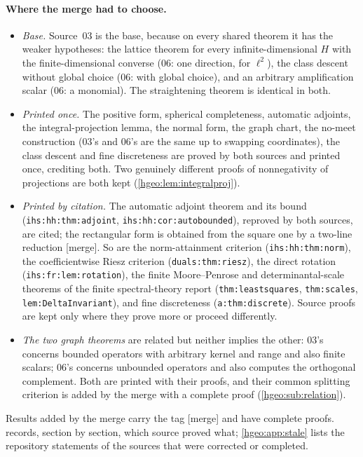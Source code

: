 \documentclass[11pt,letterpaper]{article}
\numberwithin{equation}{section}
\theoremstyle{definition}
\theoremstyle{remark}
\newcommand{\mergetag}{\textup{\textsf{\small[merge]}}}
\newcommand{\replabel}[1]{\nolinkurl{#1}}
\begin{document}
\paragraph{Where the merge had to choose.}
\begin{itemize}[leftmargin=*]
\item \emph{Base.} Source~03 is the base, because on every shared theorem
it has the weaker hypotheses: the lattice theorem for every
infinite-dimensional $H$ with the finite-dimensional converse (06:
one direction, for $\ell^2$), the class descent without global choice (06:
with global choice), and an arbitrary amplification scalar (06: a
monomial). The straightening theorem is identical in both.
\item \emph{Printed once.} The positive form, spherical completeness,
automatic adjoints, the integral-projection lemma, the normal form, the graph
chart, the no-meet construction (03's and 06's are the same up to swapping
coordinates), the class descent and fine discreteness are proved by both
sources and printed once, crediting both. Two genuinely different proofs of
nonnegativity of projections are both kept (\cref{hgeo:lem:integralproj}).
\item \emph{Printed by citation.} The automatic adjoint theorem and its
bound (\replabel{ihs:hh:thm:adjoint}, \replabel{ihs:hh:cor:autobounded}),
reproved by both sources, are cited; the rectangular form is obtained from
the square one by a two-line reduction \mergetag. So are the norm-attainment
criterion (\replabel{ihs:hh:thm:norm}), the coefficientwise Riesz criterion
(\replabel{duals:thm:riesz}), the direct rotation
(\replabel{ihs:fr:lem:rotation}), the finite Moore--Penrose and
determinantal-scale theorems of the finite spectral-theory report
(\replabel{thm:leastsquares}, \replabel{thm:scales},
\replabel{lem:DeltaInvariant}), and fine discreteness
(\replabel{a:thm:discrete}). Source proofs are kept only where they prove
more or proceed differently.
\item \emph{The two graph theorems} are related but neither implies the
other: 03's concerns bounded operators with arbitrary kernel and range and
also finite scalars; 06's concerns unbounded operators and also computes the
orthogonal complement. Both are printed with their proofs, and their common
splitting criterion is added by the merge with a complete proof
(\cref{hgeo:sub:relation}).
\end{itemize}
Results added by the merge carry the tag \mergetag{} and have complete
proofs.  records, section by section, which source
proved what; \cref{hgeo:app:stale} lists the repository statements of the
sources that were corrected or completed.
\end{document}
